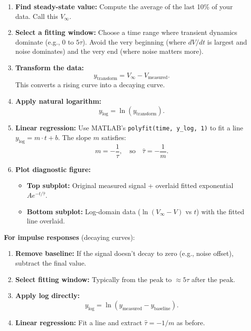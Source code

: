 \documentclass[11pt,letterpaper]{article}
\begin{document}
\begin{enumerate}
    \item \textbf{Find steady-state value:} Compute the average of the last 10\% of your data. Call this $V_\infty$.

    \item \textbf{Select a fitting window:} Choose a time range where transient dynamics dominate (e.g., 0 to $5\tau$). Avoid the very beginning (where $dV/dt$ is largest and noise dominates) and the very end (where noise matters more).

    \item \textbf{Transform the data:}
    \begin{equation}
    y_{\text{transform}} = V_\infty - V_{\text{measured}}.
    \end{equation}
    This converts a rising curve into a decaying curve.

    \item \textbf{Apply natural logarithm:}
    \begin{equation}
    y_{\text{log}} = \ln(y_{\text{transform}}).
    \end{equation}

    \item \textbf{Linear regression:} Use MATLAB's \texttt{polyfit(time, y\_log, 1)} to fit a line $y_{\text{log}} = m \cdot t + b$. The slope $m$ satisfies:
    \begin{equation}
    m = -\frac{1}{\tau}, \quad \text{so} \quad \hat{\tau} = -\frac{1}{m}.
    \end{equation}

    \item \textbf{Plot diagnostic figure:}
    \begin{itemize}
        \item \textbf{Top subplot:} Original measured signal + overlaid fitted exponential $A e^{-t/\hat{\tau}}$.
        \item \textbf{Bottom subplot:} Log-domain data ($\ln(V_\infty - V)$ vs $t$) with the fitted line overlaid.
    \end{itemize}
\end{enumerate}

\noindent
\textbf{For impulse responses} (decaying curves):

\begin{enumerate}
    \item \textbf{Remove baseline:} If the signal doesn't decay to zero (e.g., noise offset), subtract the final value.

    \item \textbf{Select fitting window:} Typically from the peak to $\approx 5\tau$ after the peak.

    \item \textbf{Apply log directly:}
    \begin{equation}
    y_{\text{log}} = \ln(y_{\text{measured}} - y_{\text{baseline}}).
    \end{equation}

    \item \textbf{Linear regression:} Fit a line and extract $\hat{\tau} = -1/m$ as before.
\end{enumerate}
\end{document}
